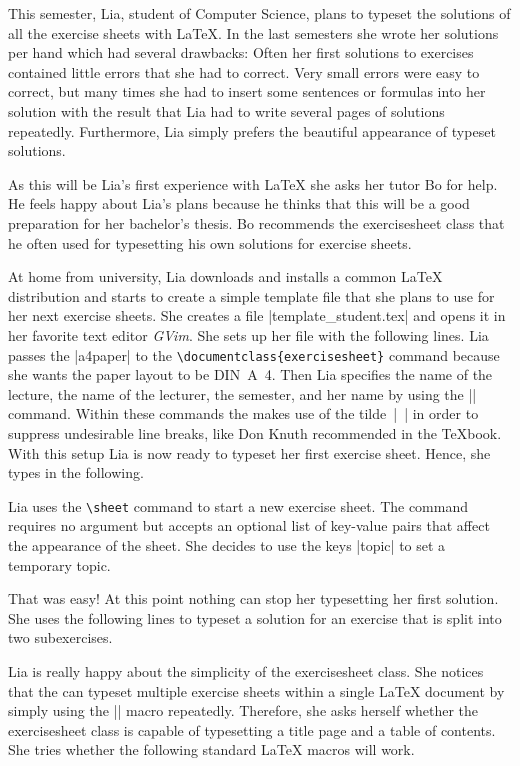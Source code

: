 \documentclass[a4paper,fleqn]{report}
\def\exercisesheet{{exercisesheet}}
\begin{document}
This semester, Lia, student of Computer Science, plans to typeset the
solutions of all the exercise sheets with \LaTeX{}. In the last
semesters she wrote her solutions per hand which had several
drawbacks: Often her first solutions to exercises contained little
errors that she had to correct. Very small errors were easy to
correct, but many times she had to insert some sentences or formulas
into her solution with the result that Lia had to write several pages
of solutions repeatedly. Furthermore, Lia simply prefers the beautiful
appearance of typeset solutions.

As this will be Lia's first experience with \LaTeX{} she asks her
tutor Bo for help. He feels happy about Lia's plans because he thinks
that this will be a good preparation for her bachelor's thesis. Bo
recommends the \exercisesheet{} class that he often used for
typesetting his own solutions for exercise sheets.

At home from university, Lia downloads and installs a common \LaTeX{}
distribution and starts to create a simple template file that she
plans to use for her next exercise sheets. She creates a file
|template_student.tex| and opens it in her favorite text editor
\emph{GVim}. She sets up her file with the following lines.
 Lia passes the
|a4paper| to the \lstinline|\documentclass{exercisesheet}| command
because she wants the paper layout to be DIN~A~4. Then Lia specifies
the name of the lecture, the name of the lecturer, the semester, and
her name by using the |\sheetconf| command. Within these commands the
makes use of the tilde~|~| in order to suppress undesirable line
breaks, like Don Knuth recommended in the \TeX{}book. With this setup
Lia is now ready to typeset her first exercise sheet. Hence, she types
in the following.

Lia uses the \lstinline|\sheet| command to start a new exercise sheet.
The command requires no argument but accepts an optional list of
key-value pairs that affect the appearance of the sheet. She decides
to use the keys |topic| to set a temporary topic.

That was easy! At this point nothing can stop her typesetting her
first solution. She uses the following lines to typeset a solution for
an exercise that is split into two subexercises.



\noindent Lia is really happy about the simplicity of the
\exercisesheet{} class. She notices that the can typeset multiple
exercise sheets within a single \LaTeX{} document by simply using the
|\sheet| macro repeatedly. Therefore, she asks herself whether the
\exercisesheet{} class is capable of typesetting a title page and a
table of contents. She tries whether the following standard \LaTeX{}
macros will work.
\end{document}
